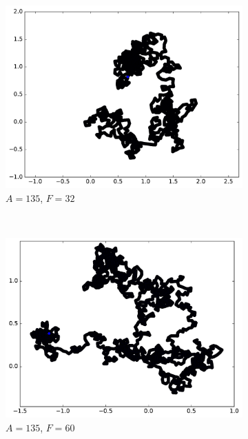 \begin{figure}[htb]
\begin{subfigure}[t]{\subImgWmo}
		\end{subfigure}
		~
		\begin{subfigure}[t]{\subImgWmo}
			\centering
			\includegraphics[width=\textwidth]{figures/ch3/synTraj_219_135_32}
			\caption[$A = 135$, $F=32$]{$A = 135$, $F=32$}
			\label{fig:synTraj_219_135_32}
		\end{subfigure}
		~
		\begin{subfigure}[t]{\subImgWmo}
			\centering
			\includegraphics[width=\textwidth]{figures/ch3/synTraj_219_135_60}
			\caption[$A = 135$, $F=60$]{$A = 135$, $F=60$}
			\label{fig:synTraj_219_135_60}
		\end{subfigure}
		~
		\begin{subfigure}[t]{\subImgWmo}

\end{subfigure}
\end{figure}
